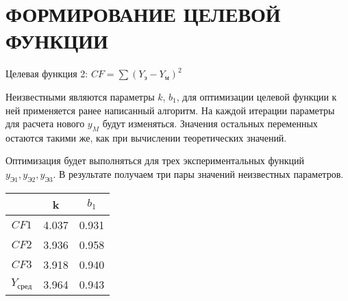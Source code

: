 \part{ФОРМИРОВАНИЕ ЦЕЛЕВОЙ ФУНКЦИИ}
    \begin{center}
        Целевая функция 2: $CF=\sum(Y_{\text{э}} - Y_{\text{м}})^2$
    \end{center}

    Неизвестными являются параметры $k$, $b_1$, для оптимизации целевой функции к ней применяется ранее написанный алгоритм. На каждой итерации параметры для расчета нового $y_M$ будут изменяться. Значения остальных переменных остаются такими же, как при вычислении теоретических значений.

    Оптимизация будет выполняться для трех экспериментальных функций $y_{\text{Э1}}, y_{\text{Э2}}, y_{\text{Э3}}$. В результате получаем три пары значений неизвестных параметров.

    \begin{center}
        \begin{tabular}{c|c|c|}
        \cline{2-3}
                                    & k    & $b_1$  \\ \hline
        \multicolumn{1}{|c|}{$CF1$} & 4.037 & 0.931 \\ \hline
        \multicolumn{1}{|c|}{$CF2$} & 3.936 & 0.958 \\ \hline
        \multicolumn{1}{|c|}{$CF3$} & 3.918 & 0.940  \\ \hline
        \multicolumn{1}{|c|}{$Y_{\text{сред}}$} & 3.964  & 0.943   \\ \hline
        \end{tabular}
    \end{center}

    \begin{center}
    \end{center}

